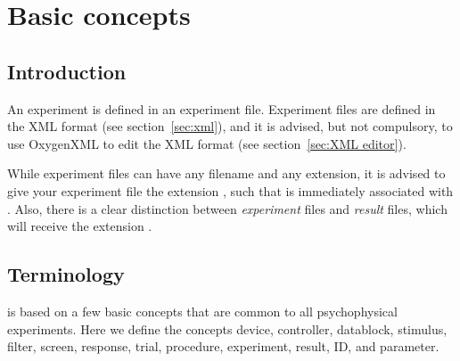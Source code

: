 \chapter{Basic concepts}
\label{chap:Basic concepts}
\section{Introduction}

An \apex experiment is defined in an experiment file. Experiment
files are defined in the XML format (see section~\ref{sec:xml}),
and it is advised, but not compulsory, to use OxygenXML to edit
the XML format (see section~\ref{sec:XML editor}).

While experiment files can have any filename and any extension, it
is advised to give your experiment file the extension
, such that is immediately associated with \apex.
Also, there is a clear distinction between \emph{experiment} files
and \emph{result} files, which will receive the extension
.






\section{Terminology}

\apex is based on a few basic concepts that are common to all
psychophysical experiments. Here we define the concepts device,
controller, datablock, stimulus, filter, screen, response, trial,
procedure, experiment, result, ID, and parameter.

